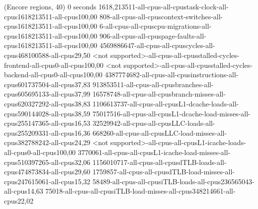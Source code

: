(Encore regions, 40)
0 seconds
1618,213511-all-cpus-all-cpustask-clock-all-cpus1618213511-all-cpus100,00
808-all-cpus-all-cpuscontext-switches-all-cpus1618213511-all-cpus100,00
6-all-cpus-all-cpuscpu-migrations-all-cpus1618213511-all-cpus100,00
906-all-cpus-all-cpuspage-faults-all-cpus1618213511-all-cpus100,00
4569886647-all-cpus-all-cpuscycles-all-cpus468100588-all-cpus29,50
<not supported>-all-cpus-all-cpusstalled-cycles-frontend-all-cpus0-all-cpus100,00
<not supported>-all-cpus-all-cpusstalled-cycles-backend-all-cpus0-all-cpus100,00
4387774682-all-cpus-all-cpusinstructions-all-cpus601737504-all-cpus37,83
913853511-all-cpus-all-cpusbranches-all-cpus605695133-all-cpus37,99
16578748-all-cpus-all-cpusbranch-misses-all-cpus620327292-all-cpus38,83
1106613737-all-cpus-all-cpusL1-dcache-loads-all-cpus590144028-all-cpus38,59
75017516-all-cpus-all-cpusL1-dcache-load-misses-all-cpus255147365-all-cpus16,53
32529942-all-cpus-all-cpusLLC-loads-all-cpus255209331-all-cpus16,36
668260-all-cpus-all-cpusLLC-load-misses-all-cpus382788242-all-cpus24,29
<not supported>-all-cpus-all-cpusL1-icache-loads-all-cpus0-all-cpus100,00
3770061-all-cpus-all-cpusL1-icache-load-misses-all-cpus510397265-all-cpus32,06
1156010717-all-cpus-all-cpusdTLB-loads-all-cpus474873834-all-cpus29,60
1759857-all-cpus-all-cpusdTLB-load-misses-all-cpus247615061-all-cpus15,32
58489-all-cpus-all-cpusiTLB-loads-all-cpus236565043-all-cpus14,63
75018-all-cpus-all-cpusiTLB-load-misses-all-cpus348214661-all-cpus22,02
